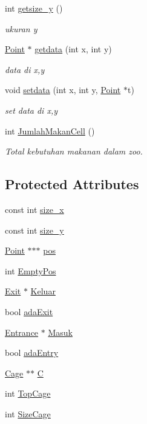 \begin{DoxyCompactItemize}
int \hyperlink{class_cell_a2a086074c55ff980bd5a0d08f40cffa9}{getsize\+\_\+y} ()
\begin{DoxyCompactList}\small\item\em ukuran y \end{DoxyCompactList}\item 
\hyperlink{class_point}{Point} $\ast$ \hyperlink{class_cell_afd9e33b00118abcea4dda009a641b00d}{getdata} (int x, int y)
\begin{DoxyCompactList}\small\item\em data di x,y \end{DoxyCompactList}\item 
void \hyperlink{class_cell_a7266e7f6752c1dd5a61242c390cb95b8}{setdata} (int x, int y, \hyperlink{class_point}{Point} $\ast$t)
\begin{DoxyCompactList}\small\item\em set data di x,y \end{DoxyCompactList}\item 
int \hyperlink{class_cell_ad1c6c85484bcc0a3d833fc2584d6e12d}{Jumlah\+Makan\+Cell} ()
\begin{DoxyCompactList}\small\item\em Total kebutuhan makanan dalam zoo. \end{DoxyCompactList}\end{DoxyCompactItemize}
\subsection*{Protected Attributes}
\begin{DoxyCompactItemize}
\item 
const int \hyperlink{class_cell_af80d7dad162978ba5aa1ff3fca5f632e}{size\+\_\+x}
\item 
const int \hyperlink{class_cell_a9d3a8fb3bdc4e5424e096230a62651e1}{size\+\_\+y}
\item 
\hyperlink{class_point}{Point} $\ast$$\ast$$\ast$ \hyperlink{class_cell_aa7701803ec8b42b42c47bc95c2e74a8a}{pos}
\item 
int \hyperlink{class_cell_a10ad8313b9ae378e9a75ad500eac457f}{Empty\+Pos}
\item 
\hyperlink{class_exit}{Exit} $\ast$ \hyperlink{class_cell_af51c25bd1f194801e7bea0f98d002dc4}{Keluar}
\item 
bool \hyperlink{class_cell_a7330f05298f6f5e73f1eaec9b56c8697}{ada\+Exit}
\item 
\hyperlink{class_entrance}{Entrance} $\ast$ \hyperlink{class_cell_a75f27b85e6ce241c3cf231a020ffd95b}{Masuk}
\item 
bool \hyperlink{class_cell_a551d038831adda94e1dfe69343aec517}{ada\+Entry}
\item 
\hyperlink{class_cage}{Cage} $\ast$$\ast$ \hyperlink{class_cell_a29c22aa957af682cf8727f4131bb326b}{C}
\item 
int \hyperlink{class_cell_a07fcbd02fd8a0363a9c0166a2df62e4c}{Top\+Cage}
\item 
int \hyperlink{class_cell_a21f64b557520adc51e3182516a4e2b39}{Size\+Cage}
\end{DoxyCompactItemize}


